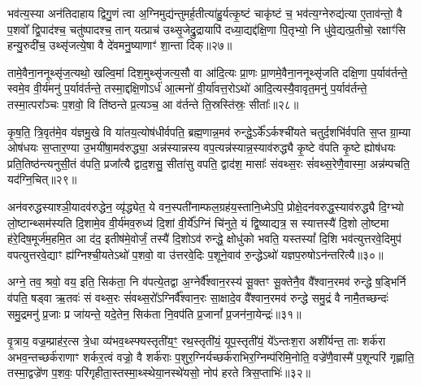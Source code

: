 भव॑त्य॒स्या अन॑तिदाहाय द्विगु॒णं त्वा अ॒ग्निमुद्य॑न्तुमर्\mbox{}ह॒तीत्या॑हु॒र्यत्कृ॒ष्टं चाकृ॑ष्टं च॒ भव॑त्य॒ग्नेरुद्य॑त्या ए॒ताव॑न्तो॒ वै प॒शवो᳚ द्वि॒पाद॑श्च॒ चतु॑ष्पादश्च॒ तान् यत्प्राच॑ उथ्सृ॒जेद्रु॒द्रायापि॑ दध्या॒द्यद्द॑क्षि॒णा पि॒तृभ्यो॒ नि धु॑वे॒द्यत्प्र॒तीचो॒ रक्षाꣳ॑सि हन्यु॒रुदी॑च॒ उथ्सृ॑जत्ये॒षा वै दे॑वमनु॒ष्याणाꣳ॑ शा॒न्ता दिक्॥२७॥

तामे॒वैना॒ननूथ्सृ॑ज॒त्यथो॒ खल्वि॒मां दिश॒मुथ्सृ॑जत्य॒सौ वा आ॑दि॒त्यः प्रा॒णः प्रा॒णमे॒वैना॒ननूथ्सृ॑जति दक्षि॒णा प॒र्याव॑र्तन्ते॒ स्वमे॒व वी॒र्य॑मनु॑ प॒र्याव॑र्तन्ते॒ तस्मा॒द्दक्षि॒णो\-ऽर्ध॑ आ॒त्मनो॑ वी॒र्या॑वत्त॒रो\-ऽथो॑ आदि॒त्यस्यै॒वावृत॒मनु॑ प॒र्याव॑र्तन्ते॒ तस्मा॒त्परा᳚ञ्चः प॒शवो॒ वि ति॑ष्ठन्ते प्र॒त्यञ्च॒ आ व॑र्तन्ते ति॒स्रस्ति॑स्रः॒ सीताः᳚॥२८॥

कृ॒ष॒ति॒ त्रि॒वृत॑मे॒व य॑ज्ञमु॒खे वि या॑तय॒त्योष॑धीर्वपति॒ ब्रह्म॒णान्न॒मव॑ रुन्द्धे॒\-ऽर्के᳚\-ऽर्कश्ची॑यते चतुर्द॒शभि॑र्वपति स॒प्त ग्रा॒म्या ओष॑धयः स॒प्तार॒ण्या उ॒भयी॑षा॒मव॑रुद्ध्या॒ अन्न॑स्यान्नस्य वप॒त्यन्न॑स्यान्न॒स्याव॑रुद्ध्यै कृ॒ष्टे व॑पति कृ॒ष्टे ह्योष॑धयः प्रति॒तिष्ठ॑न्त्यनुसी॒तं व॑पति॒ प्रजा᳚त्यै द्वाद॒शसु॒ सीता॑सु वपति॒ द्वाद॑श॒ मासाः᳚ संवथ्स॒रः सं॑वथ्स॒रेणै॒वास्मा॒ अन्न॑म्पचति॒ यद॑ग्नि॒चित्॥२९॥

अन॑वरुद्धस्याश्ञी॒यादव॑रुद्धेन॒ व्यृ॑द्ध्येत॒ ये वन॒स्पती॑नाम्फल॒ग्रह॑य॒स्तानि॒ध्मे\-ऽपि॒ प्रोक्षे॒दन॑वरुद्ध॒स्याव॑रुद्ध्यै दि॒ग्भ्यो लो॒ष्टान्थ्सम॑स्यति दि॒शामे॒व वी॒र्य॑मव॒रुध्य॑ दि॒शां वी॒र्ये᳚\-ऽग्निं चि॑नुते॒ यं द्वि॒ष्याद्यत्र॒ स स्यात्तस्यै॑ दि॒शो लो॒ष्टमा ह॑रे॒दिष॒मूर्ज॑म॒हमि॒त आ द॑द॒ इतीष॑मे॒वोर्जं॒ तस्यै॑ दि॒शो\-ऽव॑ रुन्द्धे॒ क्षोधु॑को भवति॒ यस्तस्यां᳚ दि॒शि भव॑त्युत्तरवे॒दिमुप॑ वपत्युत्तरवे॒द्याꣳ ह्य॑ग्निश्ची॒यते\-ऽथो॑ प॒शवो॒ वा उ॑त्तरवे॒दिः प॒शूने॒वाव॑ रु॒न्द्धे\-ऽथो॑ यज्ञप॒रुषो\-ऽन॑न्तरित्यै॥३०॥

{\anuvakamend[{च॒ भ॒व॒त्ये॒ताव॒द्वै पुरु॑षे वी॒र्यं॑ यत्कृ॒ष्टञ्चाकृ॑ष्टं च॒ दिख्सीता॑ अग्नि॒चिदव॒ पञ्च॑विꣳशतिश्च॥५॥}]}

अग्ने॒ तव॒ श्रवो॒ वय॒ इति॒ सिक॑ता॒ नि व॑पत्ये॒तद्वा अ॒ग्नेर्वै᳚श्वान॒रस्य॑ सू॒क्तꣳ सू॒क्तेनै॒व वै᳚श्वान॒रमव॑ रुन्द्धे ष॒ड्भिर्नि व॑पति॒ षड्वा ऋ॒तवः॑ सं वथ्स॒रः सं॑वथ्स॒रो᳚\-ऽग्निर्वै᳚श्वान॒रः सा॒क्षादे॒व वै᳚श्वान॒रमव॑ रुन्द्धे समु॒द्रं वै नामै॒तच्छन्दः॑ समु॒द्रमनु॑ प्र॒जाः प्र जा॑यन्ते॒ यदे॒तेन॒ सिक॑ता नि॒वप॑ति प्र॒जानां᳚ प्र॒जन॑ना॒येन्द्रः॑॥३१॥

वृ॒त्राय॒ वज्र॒म्प्राह॑र॒त्स त्रे॒धा व्य॑भव॒थ्स्फ्यस्तृती॑य॒ꣳ॒ रथ॒स्तृती॑यं॒ यूप॒स्तृती॑यं॒ ये᳚\-ऽन्तःश॒रा अशी᳚र्यन्त॒ ताः शर्क॑रा अभव॒न्तच्छर्क॑राणाꣳ शर्कर॒त्वं वज्रो॒ वै शर्क॑राः प॒शुर॒ग्निर्यच्छर्क॑राभिर॒ग्निम्प॑रिमि॒नोति॒ वज्रे॑णै॒वास्मै॑ प॒शून्परि॑ गृह्णाति॒ तस्मा॒द्वज्रे॑ण प॒शवः॒ परि॑गृहीता॒स्तस्मा॒थ्स्थेया॒नस्थे॑यसो॒ नोप॑ हरते त्रिस॒प्ताभिः॑॥३२॥

